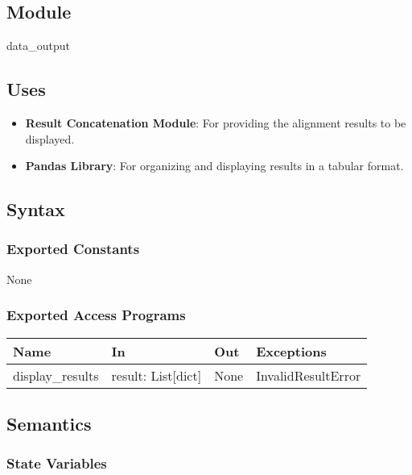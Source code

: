 \documentclass[12pt, titlepage]{article}
\begin{document}
\subsection{Module}

data\_output

\subsection{Uses}

\begin{itemize}
    \item \textbf{Result Concatenation Module}: For providing the alignment results to be displayed.
    \item \textbf{Pandas Library}: For organizing and displaying results in a tabular format.
\end{itemize}

\subsection{Syntax}

\subsubsection{Exported Constants}

None

\subsubsection{Exported Access Programs}

\begin{center}
\begin{tabular}{p{4cm} p{4cm} p{3cm} p{2cm}}
\hline
\textbf{Name} & \textbf{In} & \textbf{Out} & \textbf{Exceptions} \\
\hline
display\_results & result: List[dict] & None & InvalidResultError \\
\hline
\end{tabular}
\end{center}

\subsection{Semantics}

\subsubsection{State Variables}
\end{document}
